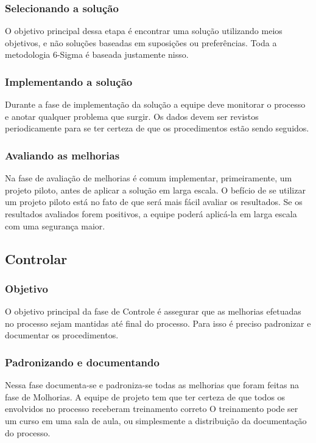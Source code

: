 \documentclass{abnt}
\begin{document}
					\subsubsection {Selecionando a solução}
					O objetivo principal dessa etapa é encontrar uma solução utilizando meios objetivos, e não soluções 
					baseadas em suposições ou preferências. Toda a metodologia 6-Sigma é baseada justamente nisso.
					\subsubsection {Implementando a solução}
					Durante a fase de implementação da solução a equipe deve monitorar o processo e anotar qualquer problema que surgir.
					Os dados devem ser revistos periodicamente para se ter certeza de que os procedimentos estão sendo seguidos.
					\subsubsection {Avaliando as melhorias}
					Na fase de avaliação de melhorias é comum implementar, primeiramente, um projeto piloto, antes de aplicar a solução 
					em larga escala. O befício de se utilizar um projeto piloto está no fato de que será mais fácil avaliar os resultados. 
					Se os resultados avaliados forem positivos, a equipe poderá aplicá-la em larga escala com uma segurança maior.
				\subsection {Controlar}
					\subsubsection {Objetivo}
					O objetivo principal da fase de Controle é assegurar que as melhorias efetuadas no processo sejam 
					mantidas até final do processo. Para isso é preciso padronizar e documentar os procedimentos.
					\subsubsection {Padronizando e documentando}
					Nessa fase documenta-se e padroniza-se todas as melhorias que foram feitas na fase de Molhorias.
					A equipe de projeto tem que ter certeza de que todos os envolvidos no processo receberam treinamento correto 
					O treinamento pode ser um curso em uma sala de aula, ou simplesmente a distribuição da documentação do processo.
\end{document}
